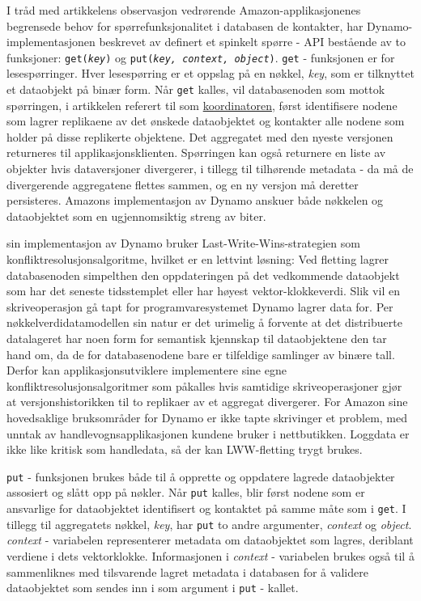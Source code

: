 I tråd med artikkelens observasjon vedrørende Amazon-applikasjonenes begrensede behov for spørrefunksjonalitet i databasen de kontakter, har Dynamo-implementasjonen beskrevet av \cite{decandia2007} definert et spinkelt spørre - API bestående av to funksjoner: \texttt{get(\emph{key})} og \texttt{put(\emph{key, context, object})}. \texttt{get} - funksjonen er for lesespørringer. Hver lesespørring er et oppslag på en nøkkel, \emph{key}, som er tilknyttet et dataobjekt på binær form. Når \texttt{get} kalles, vil databasenoden som mottok spørringen, i artikkelen referert til som \underline{koordinatoren}, først identifisere nodene som lagrer replikaene av det ønskede dataobjektet og kontakter alle nodene som holder på disse replikerte objektene. Det aggregatet med den nyeste versjonen returneres til applikasjonsklienten. Spørringen kan også returnere en liste av objekter hvis dataversjoner divergerer, i tillegg til tilhørende metadata - da må de divergerende aggregatene flettes sammen, og en ny versjon må deretter persisteres. Amazons implementasjon av Dynamo anskuer både nøkkelen og dataobjektet som en ugjennomsiktig streng av biter.

\cite{decandia2007} sin implementasjon av Dynamo bruker Last-Write-Wins-strategien som konfliktresolusjonsalgoritme, hvilket er en lettvint løsning: Ved fletting lagrer databasenoden simpelthen den oppdateringen på det vedkommende dataobjekt som har det seneste tidsstemplet eller har høyest vektor-klokkeverdi. Slik vil en skriveoperasjon gå tapt for programvaresystemet Dynamo lagrer data for. Per nøkkelverdidatamodellen sin natur er det urimelig å forvente at det distribuerte datalageret har noen form for semantisk kjennskap til dataobjektene den tar hand om, da de for databasenodene bare er tilfeldige samlinger av binære tall. Derfor kan applikasjonsutviklere implementere sine egne konfliktresolusjonsalgoritmer som påkalles hvis samtidige skriveoperasjoner gjør at versjonshistorikken til to replikaer av et aggregat divergerer. For Amazon sine hovedsaklige bruksområder for Dynamo er ikke tapte skrivinger et problem, med unntak av handlevognsapplikasjonen kundene bruker i nettbutikken. Loggdata er ikke like kritisk som handledata, så der kan LWW-fletting trygt brukes.

\texttt{put} - funksjonen brukes både til å opprette og oppdatere lagrede dataobjekter assosiert og slått opp på nøkler. Når \texttt{put} kalles, blir først nodene som er ansvarlige for dataobjektet identifisert og kontaktet på samme måte som i \texttt{get}. I tillegg til aggregatets nøkkel, \emph{key}, har \texttt{put} to andre argumenter, \emph{context} og \emph{object}. \emph{context} - variabelen representerer metadata om dataobjektet som lagres, deriblant verdiene i dets vektorklokke. Informasjonen i \emph{context} - variabelen brukes også til å sammenliknes med tilsvarende lagret metadata i databasen for å validere dataobjektet som sendes inn i som argument i \texttt{put} - kallet.

